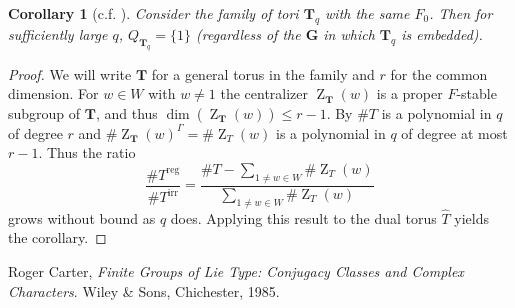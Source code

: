 \documentclass[11pt]{amsart}
\theoremstyle{plain}
\newtheorem*{corollary}{Corollary}
\theoremstyle{definition}
\DeclareMathOperator{\Z}{Z}
\newcommand{\T}{\mathbf{T}}
\newcommand{\G}{\mathbf{G}}
\newcommand{\Galk}{\Gamma}
\newcommand{\hatT}{\hat{T}}
\newcommand{\Treg}{T^{\operatorname{reg}}}
\newcommand{\Tirr}{T^{\operatorname{irr}}}
\begin{document}
\begin{corollary}[{c.f. \cite[Lemma 8.4.2]{carter}}]
Consider the family of tori $\T_q$ with the same $F_0$.  Then for sufficiently large $q$, $Q_{\T_q} = \{ 1 \}$ (regardless of the $\G$ in which $\T_q$ is embedded).
\end{corollary}
\begin{proof}
We will write $\T$ for a general torus in the family and $r$ for the common dimension.  For $w \in W$ with $w \ne 1$ the centralizer $\Z_{\T}(w)$ is a proper $F$-stable subgroup of $\T$, and thus $\dim(\Z_{\T}(w)) \le r - 1$.  By \cite[3.3.5]{carter} $\# T$ is a polynomial in $q$ of degree $r$ and $\# \Z_{\T}(w)^\Galk = \# \Z_T(w)$ is a polynomial in $q$ of degree at most $r-1$.  Thus the ratio
$$\frac{\# \Treg}{\# \Tirr} = \frac{\# T - \sum_{1 \ne w \in W} \# \Z_T(w)}{\sum_{1 \ne w \in W} \# \Z_T(w)}$$
grows without bound as $q$ does.  Applying this result to the dual torus $\hatT$ yields the corollary.
\end{proof}

\begin{thebibliography}{9}
  Roger Carter,
  \emph{Finite Groups of Lie Type: Conjugacy Classes and Complex Characters}.  Wiley \& Sons, Chichester, 1985.
\end{thebibliography}
\end{document}
